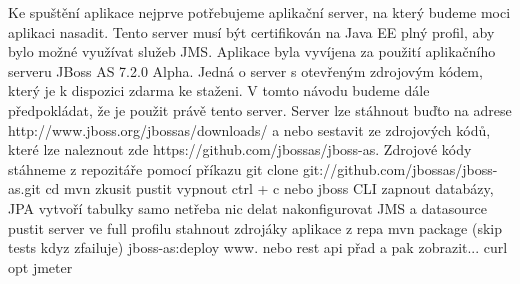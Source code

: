 \documentclass[122pt,oneside]{fithesis}
\begin{document}
Ke spuštění aplikace nejprve potřebujeme aplikační server, na který budeme moci aplikaci nasadit. Tento server musí být certifikován na Java EE plný profil, aby bylo možné využívat služeb JMS. Aplikace byla vyvíjena za použití aplikačního serveru JBoss AS 7.2.0 Alpha. Jedná o server s otevřeným zdrojovým kódem, který je k dispozici zdarma ke staženi. V tomto návodu budeme dále předpokládat, že je použit právě tento server. Server lze stáhnout buďto na adrese http://www.jboss.org/jbossas/downloads/ a nebo sestavit ze zdrojových kódů, které lze naleznout zde https://github.com/jbossas/jboss-as.
Zdrojové kódy stáhneme z repozitáře pomocí příkazu 
git clone git://github.com/jbossas/jboss-as.git
cd 
mvn 
zkusit pustit
vypnout ctrl + c nebo jboss CLI
zapnout databázy, JPA vytvoří tabulky samo netřeba nic delat
nakonfigurovat JMS a datasource
pustit server ve full profilu
stahnout zdrojáky aplikace z repa
mvn package (skip tests kdyz zfailuje)
jboss-as:deploy
www. nebo rest api přad a pak zobrazit... curl
opt jmeter
\end{document}
